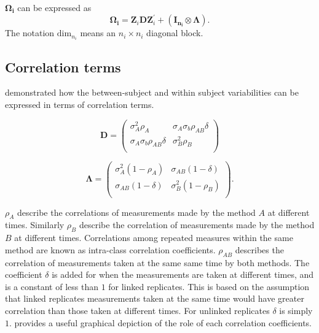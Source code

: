 \documentclass[12pt, a4paper]{article}
\theoremstyle{plain}
\theoremstyle{definition}
\theoremstyle{remark}
\begin{document}
$\boldsymbol{\Omega_{i}}$ can be expressed as
\[
\boldsymbol{\Omega_{i}} = \boldsymbol{Z}_{i}\boldsymbol{D}\boldsymbol{Z}_{i}^\prime + ({\boldsymbol{I_{n_{i}}} \otimes \boldsymbol{\Lambda}}).
\]
The notation $\mbox{dim}_{n_{i}}$ means an $n_{i} \times n_{i}$ diagonal block.

\subsection{Correlation terms}
\citet{hamlett} demonstrated how the between-subject and within subject variabilities can be expressed in terms of
correlation terms.

\[
\boldsymbol{D} = \left( \begin{array}{cc}
                        \sigma^2_{A}\rho_{A} & \sigma_{A}\sigma_{b}\rho_{AB}\delta \\
                        \sigma_{A}\sigma_{b}\rho_{AB}\delta & \sigma^2_{B}\rho_{B}\\

                      \end{array}\right)
\]

\[
\boldsymbol{\Lambda} = \left(
\begin{array}{cc}
  \sigma^2_{A}(1-\rho_{A}) & \sigma_{AB}(1-\delta)  \\
    \sigma_{AB}(1-\delta) & \sigma^2_{B}(1-\rho_{B}) \\
\end{array}\right).
\]

$\rho_{A}$ describe the correlations of measurements made by the method $A$ at different times. Similarly $\rho_{B}$ describe the correlation of measurements made by the method $B$ at different times. Correlations among repeated measures within the same method are known as intra-class correlation coefficients. $\rho_{AB}$ describes the correlation of measurements taken at the same same time by both methods. The coefficient $\delta$ is added for when the measurements are taken at different times, and is a constant of less than $1$ for linked replicates. This is based on the assumption that linked replicates measurements taken at the same time would have greater correlation than those taken at different times. For unlinked replicates $\delta$ is simply $1$. \citet{hamlett} provides a useful graphical depiction of the role of each correlation coefficients.

\newpage
\end{document}

